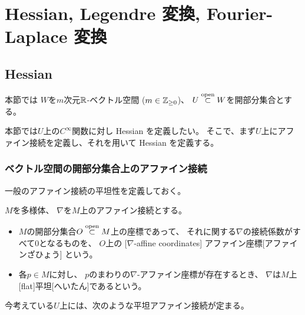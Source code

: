 \documentclass[report]{jlreq}
\begin{document}
%
\chapter{Hessian, Legendre 変換, Fourier-Laplace 変換}

%
\section{Hessian}

本節では
$W$を$m$次元$\mathbb{R}$-ベクトル空間 ($m \in \mathbb{Z}_{\ge 0}$)、
$U \stackrel{\text{open}}{\subset} W$を開部分集合とする。

本節では$U$上の$C^\infty$関数に対し Hessian を定義したい。
そこで、まず$U$上にアファイン接続を定義し、それを用いて Hessian を定義する。

\subsection{ベクトル空間の開部分集合上のアファイン接続}

一般のアファイン接続の平坦性を定義しておく。

\begin{definition}[平坦アファイン接続]
    $M$を多様体、
    $\nabla$を$M$上のアファイン接続とする。
    \begin{itemize}
        \item $M$の開部分集合$O \stackrel{\text{open}}{\subset} M$上の座標であって、
            それに関する$\nabla$の接続係数がすべて$0$となるものを、
            $O$上の
            [$\nabla$-affine coordinates]
                {アファイン座標}[アファインざひょう]
            という。
        \item 各$p \in M$に対し、
            $p$のまわりの$\nabla$-アファイン座標が存在するとき、
            $\nabla$は$M$上
            [flat]{平坦}[へいたん]であるという。
    \end{itemize}
\end{definition}

今考えている$U$上には、次のような平坦アファイン接続が定まる。
\end{document}
